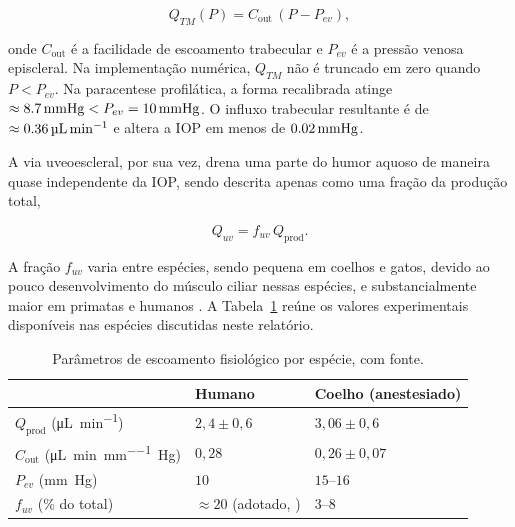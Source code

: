 \begin{equation}
Q_{TM}(P) = C_{\text{out}}\,(P-P_{ev}),
\label{eq:trabecular}
\end{equation}
 
onde $C_{\text{out}}$ é a facilidade de escoamento trabecular e $P_{ev}$ é a pressão venosa episcleral. Na implementação numérica, $Q_{TM}$ não é truncado em zero quando $P<P_{ev}$. Na paracentese profilática, a forma recalibrada atinge $\approx\SI{8{,}7}{\milli\meter Hg}<P_{ev}=\SI{10}{\milli\meter Hg}$. O influxo trabecular resultante é de $\approx\SI{0{,}36}{\micro\liter\per\minute}$ e altera a IOP em menos de $\SI{0{,}02}{\milli\meter Hg}$.
 
A via uveoescleral, por sua vez, drena uma parte do humor aquoso de maneira quase independente da IOP, sendo descrita apenas como uma fração da produção total,
 
\begin{equation}
Q_{uv} = f_{uv}\,Q_{\text{prod}}.
\label{eq:uveoscleral}
\end{equation}
 
A fração $f_{uv}$ varia entre espécies, sendo pequena em coelhos e gatos, devido ao pouco desenvolvimento do músculo ciliar nessas espécies, e substancialmente maior em primatas e humanos \citep{alm2009}. A Tabela~\ref{tab:especies} reúne os valores experimentais disponíveis nas espécies discutidas neste relatório.
 
\begin{table}[htbp]
\centering
\caption{Parâmetros de escoamento fisiológico por espécie, com fonte.}
\label{tab:especies}
\begin{tabular}{lp{4.2cm}p{4.2cm}}
\toprule
 & \centering Humano & \centering\arraybackslash Coelho (anestesiado) \\
\midrule
$Q_{\text{prod}}$ (\unit{\micro\liter\per\minute}) & $2{,}4\pm0{,}6$ \citep{goel2010} & $3{,}06\pm0{,}6$ \citep{kiel2011ciliary} \\
$C_{\text{out}}$ (\unit{\micro\liter\per\minute\per\milli\meter Hg}) & $0{,}28$ \citep{goel2010} & $0{,}26\pm0{,}07$ \citep{fourman1989outflow} \\
$P_{ev}$ (\unit{\milli\meter Hg}) & $10$ \citep{ethier2004biomech} & $15$--$16$ \citep{kiel2015evp} \\
$f_{uv}$ (\% do total) & $\approx 20$ (adotado, \citealp{alm2009}) & $3$--$8$ \citep{alm2009} \\
\bottomrule
\end{tabular}
\end{table}
 
